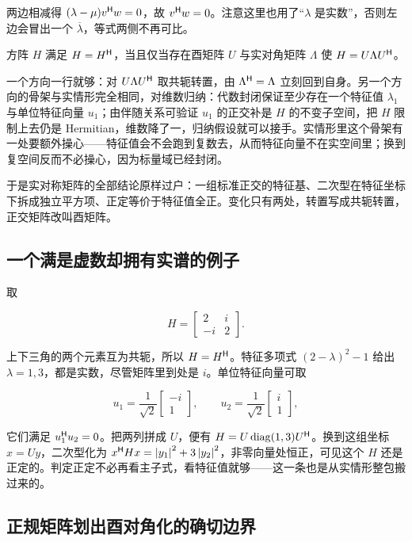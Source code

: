 两边相减得 \((\lambda-\mu)v^{\mathsf{H}}w=0\)，故 \(v^{\mathsf{H}}w=0\)。注意这里也用了``\(\lambda\) 是实数''，否则左边会冒出一个 \(\overline\lambda\)，等式两侧不再可比。

\begin{theorem}[复谱定理]
方阵 \(H\) 满足 \(H=H^{\mathsf{H}}\)，当且仅当存在酉矩阵 \(U\) 与实对角矩阵 \(\Lambda\) 使 \(H=U\Lambda U^{\mathsf{H}}\)。
\end{theorem}

一个方向一行就够：对 \(U\Lambda U^{\mathsf{H}}\) 取共轭转置，由 \(\Lambda^{\mathsf{H}}=\Lambda\) 立刻回到自身。另一个方向的骨架与实情形完全相同，对维数归纳：代数封闭保证至少存在一个特征值 \(\lambda_1\) 与单位特征向量 \(u_1\)；由伴随关系可验证 \(u_1\) 的正交补是 \(H\) 的不变子空间，把 \(H\) 限制上去仍是 Hermitian，维数降了一，归纳假设就可以接手。实情形里这个骨架有一处要额外操心——特征值会不会跑到复数去，从而特征向量不在实空间里；换到复空间反而不必操心，因为标量域已经封闭。

于是实对称矩阵的全部结论原样过户：一组标准正交的特征基、二次型在特征坐标下拆成独立平方项、正定等价于特征值全正。变化只有两处，转置写成共轭转置，正交矩阵改叫酉矩阵。

\subsection{一个满是虚数却拥有实谱的例子}

取

\[
H=\begin{bmatrix}2&i\\-i&2\end{bmatrix}.
\]

上下三角的两个元素互为共轭，所以 \(H=H^{\mathsf{H}}\)。特征多项式 \((2-\lambda)^2-1\) 给出 \(\lambda=1,3\)，都是实数，尽管矩阵里到处是 \(i\)。单位特征向量可取

\[
u_1=\frac1{\sqrt2}\begin{bmatrix}-i\\1\end{bmatrix},
\qquad
u_2=\frac1{\sqrt2}\begin{bmatrix}i\\1\end{bmatrix},
\]

它们满足 \(u_1^{\mathsf{H}}u_2=0\)。把两列拼成 \(U\)，便有 \(H=U\operatorname{diag}(1,3)U^{\mathsf{H}}\)。换到这组坐标 \(x=Uy\)，二次型化为 \(x^{\mathsf{H}}Hx=\left|y_1\right|^2+3\left|y_2\right|^2\)，非零向量处恒正，可见这个 \(H\) 还是正定的。判定正定不必再看主子式，看特征值就够——这一条也是从实情形整包搬过来的。

\subsection{正规矩阵划出酉对角化的确切边界}

